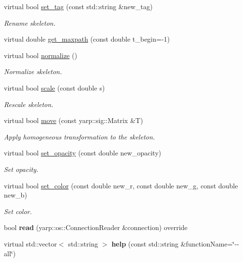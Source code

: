 \begin{DoxyCompactItemize}
virtual bool \mbox{\hyperlink{classskeletonPlayer__IDL_a3a4632867441416e3606b814b5a99fba}{set\+\_\+tag}} (const std\+::string \&new\+\_\+tag)
\begin{DoxyCompactList}\small\item\em Rename skeleton. \end{DoxyCompactList}\item 
virtual double \mbox{\hyperlink{classskeletonPlayer__IDL_adf73eb4c86d9d8a19149b29db4284538}{get\+\_\+maxpath}} (const double t\+\_\+begin=-\/1)
\item 
virtual bool \mbox{\hyperlink{classskeletonPlayer__IDL_ab77b1ce1855a8fbdc352ac22ed9a6cf4}{normalize}} ()
\begin{DoxyCompactList}\small\item\em Normalize skeleton. \end{DoxyCompactList}\item 
virtual bool \mbox{\hyperlink{classskeletonPlayer__IDL_ac70d533dc6ed1e642e0e03e639b6658c}{scale}} (const double s)
\begin{DoxyCompactList}\small\item\em Rescale skeleton. \end{DoxyCompactList}\item 
virtual bool \mbox{\hyperlink{classskeletonPlayer__IDL_a0419e3b52e359f4b1fe9c8efba2db38e}{move}} (const yarp\+::sig\+::\+Matrix \&T)
\begin{DoxyCompactList}\small\item\em Apply homogeneous transformation to the skeleton. \end{DoxyCompactList}\item 
virtual bool \mbox{\hyperlink{classskeletonPlayer__IDL_ad25203e961712205d87429065935c195}{set\+\_\+opacity}} (const double new\+\_\+opacity)
\begin{DoxyCompactList}\small\item\em Set opacity. \end{DoxyCompactList}\item 
virtual bool \mbox{\hyperlink{classskeletonPlayer__IDL_aceb3db0756cc78fd54088bfb2a8b9c39}{set\+\_\+color}} (const double new\+\_\+r, const double new\+\_\+g, const double new\+\_\+b)
\begin{DoxyCompactList}\small\item\em Set color. \end{DoxyCompactList}\item 
\mbox{\label{classskeletonPlayer__IDL_a5ef1b1ea76e8641c56ce9866b6a0e5bc}} 
bool {\bfseries read} (yarp\+::os\+::\+Connection\+Reader \&connection) override
\item 
\mbox{\label{classskeletonPlayer__IDL_a1425684521df6a0b5591f9284aea9d65}} 
virtual std\+::vector$<$ std\+::string $>$ {\bfseries help} (const std\+::string \&function\+Name=\char`\"{}-\/-\/all\char`\"{})
\end{DoxyCompactItemize}


